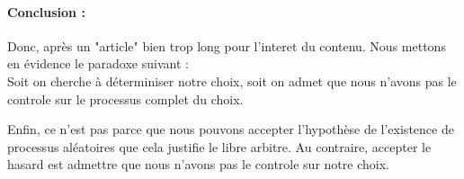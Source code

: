 \documentclass{article}
\begin{document}
\paragraph{Conclusion : }
Donc, après un "article" bien trop long pour l'interet du contenu. Nous mettons 
en évidence le paradoxe suivant : \\
Soit on cherche à déterminiser notre choix, soit on admet que nous n'avons pas 
le controle sur le processus complet du choix. 

Enfin, ce n'est pas parce que nous pouvons accepter l'hypothèse de l'existence 
de processus aléatoires que cela justifie le libre arbitre. Au contraire, 
accepter le hasard est admettre que nous n'avons pas le controle sur notre 
choix.
\end{document}
